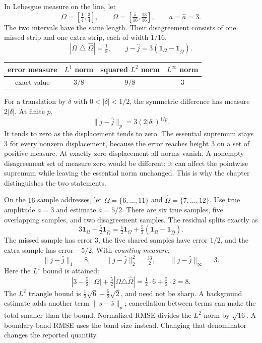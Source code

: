 In Lebesgue measure on the line, let
\[
\Omega=[\tfrac14,\tfrac34],\qquad
\widehat\Omega=[\tfrac5{16},\tfrac{13}{16}],\qquad a=\widehat a=3.
\]
The two intervals have the same length. Their disagreement consists of one missed strip and one extra strip, each of width $1/16$.
\[
|\Omega\mathbin{\triangle}\widehat\Omega|=\tfrac18,
\qquad j-\widehat j=3(\mathbf1_\Omega-\mathbf1_{\widehat\Omega}).
\]
\begin{center}
\begin{tabular}{c|ccc}
error measure & $L^1$ norm & squared $L^2$ norm & $L^\infty$ norm\\\hline
exact value & $3/8$ & $9/8$ & $3$
\end{tabular}
\end{center}
For a translation by $\delta$ with $0<|\delta|<1/2$, the symmetric difference has measure $2|\delta|$. At finite $p$,
\[
\|j-\widehat j\|_p=3(2|\delta|)^{1/p}.
\]
It tends to zero as the displacement tends to zero. The essential supremum stays $3$ for every nonzero displacement, because the error reaches height $3$ on a set of positive measure. At exactly zero displacement all norms vanish.
A nonempty disagreement set of measure zero would be different: it can affect the pointwise supremum while leaving the essential norm unchanged. This is why the chapter distinguishes the two statements.

On the $16$ sample addresses, let $\Omega=\{6,\ldots,11\}$ and $\widehat\Omega=\{7,\ldots,12\}$. Use true amplitude $a=3$ and estimate $\widehat a=5/2$. There are six true samples, five overlapping samples, and two disagreement samples.
The residual splits exactly as
\[
3\mathbf1_\Omega-\tfrac52\mathbf1_{\widehat\Omega}
=\tfrac12\mathbf1_\Omega+\tfrac52(\mathbf1_\Omega-\mathbf1_{\widehat\Omega}).
\]
The missed sample has error $3$, the five shared samples have error $1/2$, and the extra sample has error $-5/2$. With \emph{counting measure},
\[
\|j-\widehat j\|_1=8,
\qquad \|j-\widehat j\|_2^2=\tfrac{33}{2},
\qquad \|j-\widehat j\|_\infty=3.
\]
Here the $L^1$ bound is attained:
\[
|3-\tfrac52|\,|\Omega|+\tfrac52|\Omega\triangle\widehat\Omega|
=\tfrac12\cdot6+\tfrac52\cdot2=8.
\]
The $L^2$ triangle bound is $\frac12\sqrt6+\frac52\sqrt2$, and need not be sharp. A background estimate adds another term $\|s-\widehat s\|_p$; cancellation between terms can make the total smaller than the bound.
Normalized RMSE divides the $L^2$ norm by $\sqrt{16}$. A boundary-band RMSE uses the band size instead. Changing that denominator changes the reported quantity.

